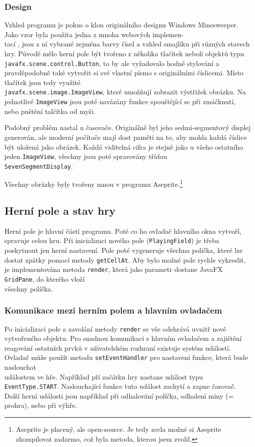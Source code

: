 \subsubsection{Design}
Vzhled programu je pokus o klon originálního designu Windows Minesweeper. Jako vzor byla použita jedna z mnoha
webových implemen-\\tací \autocite{playminesweeper}, jsou z ní vybrané zejména barvy čísel a vzhled smajlíku při
různých stavech hry. Původě mělo herní pole být tvořeno z několika tlačítek neboli objektů typu \\
{\tt javafx.scene.control.Button}, to by ale vyžadovalo hodně stylování a pravděpodobně také vytvořit si své
vlastní písmo s originálními číslicemi. Místo tlačítek jsou tedy využité \\{\tt javafx.scene.image.ImageView},
které umožňují zobrazit výstřižek obrázku. Na jednotlivé {\tt ImageView} jsou poté navázány funkce spouštějící
se při zmáčknutí, nebo puštění talčítka od myši.

Podobný problém nastal u časovače. Originálně byl jeho sedmi-segmentový displej generován, ale moderní
počítače mají dost paměti na to, aby mohla každá číslice být uložená jako obrázek. Každá viditelná cifra je
stejně jako u všeho ostatního jeden {\tt ImageView}, všechny jsou poté spravovány třídou \\{\tt SevenSegmentDisplay}.

Všechny obrázky byly tvořeny mnou v programu Aseprite.\footnote{Aseprite je placený, ale open-source. Je tedy zcela možné si
Aseprite zkompilovat zadarmo, což byla metoda, kterou jsem zvolil.}

\subsection{Herní pole a stav hry}
Herní pole je hlavní částí programu. Poté co ho ovladač hlavního okna vytvoří, spravuje celou hru. Při inicializaci
nového pole ({\tt PlayingField}) je třeba poskytnout jen herní nastavení. Pole poté vygeneruje všechna políčka,
které lze dostat zpátky pomocí metody {\tt getCellAt}. Aby bylo možné pole rychle vykreslit,
je implementována metoda {\tt render}, která jako parametr dostane JavaFX {\tt GridPane}, do kterého
vloží \\všechny políčka.

\subsubsection{Komunikace mezi herním polem a hlavním ovladačem}
Po inicializaci pole a zavolání metody {\tt render} se vše odehrává uvnitř nově vytvořeného objektu.
Pro snadnou komunikaci s hlavním ovladačem a zajištění reagování ostatních prvků v uživatelském rozhraní existuje
systém událostí. Ovladač může použít metodu {\tt setEventHandler} pro nastavení funkce, která bude
naslouchat \\událostem ve hře. Například pří začátku hry nastane událost typu {\tt EventType.START}. 
Naslouchající funkce tuto událost zachytí a zapne časovač. Další herní události jsou například při odhalování políčka,
odhalení miny (= prohra), nebo při výhře.

